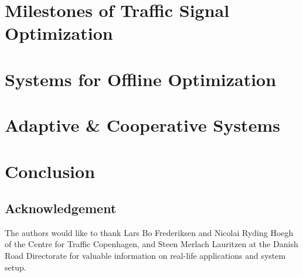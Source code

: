 \documentclass [a4paper, 10pt]{article}
\begin{document}
%

\section{Milestones of Traffic Signal Optimization}


\section{Systems for Offline Optimization}


\section{Adaptive \& Cooperative Systems}


%

\section{Conclusion}


\subsection*{Acknowledgement} The authors would like to thank Lars Bo Frederiksen and Nicolai Ryding Hoegh of the Centre for Traffic Copenhagen, and Steen Merlach
Lauritzen at the Danish Road Directorate for valuable information on
real-life applications and system setup.

\clearpage



\end{document}
